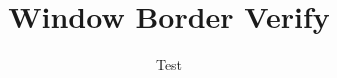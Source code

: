 \documentclass[type=report,theme=light,language=de]{semio}
\title{Window Border Verify}
\author{Test}
\begin{document}
\makecoverpages
\end{document}
